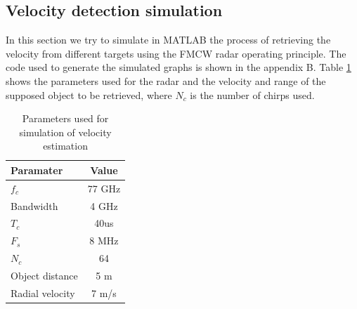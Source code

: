 \subsection{Velocity detection simulation}
In this section we try to simulate in MATLAB the process of retrieving the velocity from different targets using the \ac{FMCW} \ac{radar} operating principle. The code used to generate the simulated graphs is shown in the appendix B. Table \ref{tab:table2} shows the parameters used for the radar and the velocity and range of the supposed object to be retrieved, where $N_c$ is the number of chirps used. 
\begin{table}[ht]
  \begin{center}
    \caption{Parameters used for simulation of velocity estimation}
    \label{tab:table2}
    \begin{tabular}{l|c} %
      \textbf{Paramater} & \textbf{Value } \\
      \hline
      $f_c$ & 77 GHz \\
      Bandwidth & 4 GHz \\
      $T_c$ & 40us \\
      $F_s$ & 8 MHz \\
      $N_c$ & 64 \\
      Object distance & 5  m \\
      Radial velocity & 7  m/s
    \end{tabular}
  \end{center}
\end{table}

